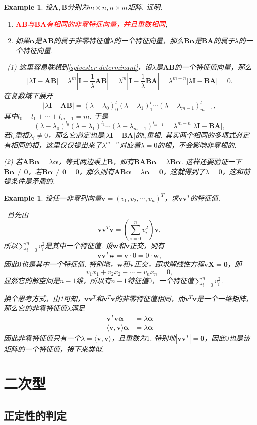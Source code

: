 \documentclass{article}
\newtheorem{example}[theorem]{Example}
\newcommand{\hints}{{\color{blue} \text{hints}}}
\newcommand{\mbf}[1]{\bm{#1}}
\newcommand\inp[2]{\langle #1, #2 \rangle} %
\newcommand{\redt}[1]{\textcolor{red}{#1}}
\begin{document}
\begin{example}\label{eigenvalue-of-AB-and-BA}
\rm 设$\mbf{A},\mbf{B}$分别为$m \times n, n \times m$矩阵. 证明:
\begin{enumerate}
	\item \redt{$\mbf{AB}$与$\mbf{BA}$有相同的非零特征向量，并且重数相同};
	\item 如果$\mbf{\alpha}$是$\mbf{AB}$的属于非零特征值$\lambda$的一个特征向量，那么$\mbf{B\alpha}$是$\mbf{BA}$的属于$\lambda$的一个特征向量. 
\end{enumerate}

\hints\ (1) 这里容易联想到\ref{sylvester determinant}，设$\lambda$是$\mbf{AB}$的一个特征值向量，那么
$$
|\lambda\mbf{I} - \mbf{AB}| = \lambda^m|\mbf{I}-\frac{1}{\lambda}\mbf{AB}| = \lambda^m |\mbf{I} - \frac{1}{\lambda}\mbf{BA}| = \lambda^{m-n}|\lambda\mbf{I} - \mbf{BA}| = 0. 
$$
在复数域下展开
$$
|\lambda\mbf{I} - \mbf{AB}| = (\lambda- \lambda_0)^l_0(\lambda- \lambda_1)^l_1\cdots(\lambda- \lambda_{m-1})^l_{m-1}, 
$$
其中$l_0 + l_1 + \cdots + l_{m-1} = m$. 于是
$$
(\lambda- \lambda_0)^{l_0}(\lambda- \lambda_1)^{l_1}\cdots(\lambda- \lambda_{m-1})^{l_{m-1}} = \lambda^{m-n}|\lambda\mbf{I} - \mbf{BA}|,
$$
若$l_i$重根$\lambda_i \neq 0$，那么它必定也是$|\lambda\mbf{I}-\mbf{BA}|$的$l_i$重根. 其实两个相同的多项式必定有相同的根，这里仅仅提出来了$\lambda^{m-n}$对应着$\lambda = 0$的根，不会影响非零根的. 

(2) 若$\mbf{AB\alpha} = \lambda\mbf{\alpha}$，等式两边乘上$\mbf{B}$，即有$\mbf{BAB\alpha} = \lambda\mbf{B\alpha}$. 这样还要验证一下$\mbf{B}\mbf{\alpha} \neq  \mbf{0}$，若$\mbf{B}\mbf{\alpha} \neq  \mbf{0} = 0$，那么则有$\mbf{AB\alpha} = \lambda\mbf{\alpha} = \mbf{0}$，这就得到了$\lambda = 0$，这和前提条件是矛盾的. 
\end{example}


\begin{example}
\rm 设任一非零列向量$\mbf{v}=(v_1,v_2,\cdots,v_n)^T$，求$\mbf{v}\mbf{v}^T$的特征值.

\hints\ 首先由
$$
\mbf{v}\mbf{v}^T\mbf{v} = \left(\sum\limits_{i = 0}^{n}v_i^2 \right)\mbf{v},
$$
所以$\sum\limits_{i = 0}^{n}v_i^2$是其中一个特征值. 设$\mbf{w}$和$\mbf{v}$正交，则有
$$
\mbf{v}\mbf{v}^T\mbf{w} = \mbf{v} \cdot 0 = 0 \cdot \mbf{w}, 
$$
因此$0$也是其中一个特征值. 特别地，$\mbf{w}$和$\mbf{v}$正交，即求解线性方程$\mbf{v}\mbf{X} = \mbf{0}$，即
$$
v_1 x_1 + v_2 x_2 + \cdots + v_n x_n = 0, 
$$
显然它的解空间是$n-1$维，所以有$n-1$特征值$0$，一个特征值$\sum\limits_{i = 0}^{n}v_i^2$. 

换个思考方式，由\ref{eigenvalue-of-AB-and-BA}可知，$\mbf{v}\mbf{v}^T$和$\mbf{v}^T\mbf{v}$的非零特征值相同，而$\mbf{v}^T\mbf{v}$是一个一维矩阵，那么它的非零特征值$\lambda$满足
$$
\begin{array}{ll}
\mbf{v}^T\mbf{v}\mbf{\alpha} &= \lambda \mbf{\alpha} \\
\inp{\mbf{v}}{\mbf{v}} \mbf{\alpha} & = \lambda \mbf{\alpha}
\end{array} 
$$
因此非零特征值只有一个$\lambda = \inp{\mbf{v}}{\mbf{v}}$，且重数为$1$. 特别地$|\mbf{v}\mbf{v}^T| = \mbf{0}$，因此$0$也是该矩阵的一个特征值，接下来类似. 
\end{example}

\section{二次型}

\subsection{正定性的判定}
\end{document}
